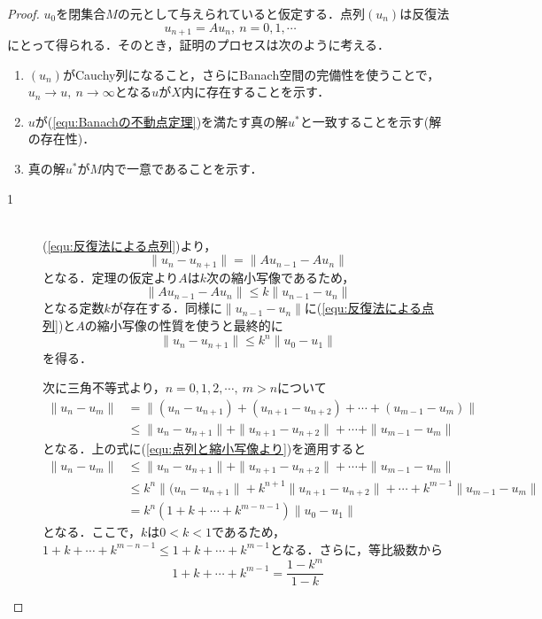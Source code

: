 \documentclass[11pt,a4paper,titlepage]{jsreport}
\theoremstyle{definition}
\begin{document}
\begin{proof}
  $u_0$を閉集合$M$の元として与えられていると仮定する．点列$(u_n)$は反復法
  \begin{equation}
    \label{equ:反復法による点列}
    u_{n+1}=Au_n,\ n=0,1,\cdots
  \end{equation}
  にとって得られる．そのとき，証明のプロセスは次のように考える．
  \begin{enumerate}
    \item $(u_n)$がCauchy列になること，さらにBanach空間の完備性を使うことで，$u_n\rightarrow u,\ n\rightarrow \infty$となる$u$が$X$内に存在することを示す．
    \item $u$が(\ref{equ:Banachの不動点定理})を満たす真の解$u^*$と一致することを示す(解の存在性)．
    \item 真の解$u^*$が$M$内で一意であることを示す．
  \end{enumerate}

  \begin{description}
    \item[1]
      \quad\\
      (\ref{equ:反復法による点列})より，
      \begin{equation}
        \|u_n-u_{n+1}\|=\|Au_{n-1}-Au_{n}\|
      \end{equation}
      となる．定理の仮定より$A$は$k$次の縮小写像であるため，
      \begin{equation}
        \|Au_{n-1}-Au_{n}\|\leq k\|u_{n-1}-u_{n}\|
      \end{equation}
      となる定数$k$が存在する．同様に$\|u_{n-1}-u_{n}\|$に(\ref{equ:反復法による点列})と$A$の縮小写像の性質を使うと最終的に
      \begin{equation}
        \label{equ:点列と縮小写像より}
        \|u_{n}-u_{n+1}\|\leq k^n\|u_{0}-u_{1}\|
      \end{equation}
      を得る．

      次に三角不等式より，$n=0,1,2,\cdots,\ m>n$について
      \begin{align}
        \|u_{n}-u_{m}\| & = \|(u_{n}-u_{n+1})+(u_{n+1}-u_{n+2})+\cdots+(u_{m-1}-u_{m})\|      \\
                        & \leq \|u_{n}-u_{n+1}\|+\|u_{n+1}-u_{n+2}\|+\cdots+\|u_{m-1}-u_{m}\|
      \end{align}
      となる．上の式に(\ref{equ:点列と縮小写像より})を適用すると
      \begin{align}
        \|u_{n}-u_{m}\| & \leq \|u_{n}-u_{n+1}\|+\|u_{n+1}-u_{n+2}\|+\cdots+\|u_{m-1}-u_{m}\| \label{equ:-1}    \\
                        & \leq k^n\|(u_{n}-u_{n+1}\|+k^{n+1}\|u_{n+1}-u_{n+2}\|+\cdots+k^{m-1}\|u_{m-1}-u_{m}\| \\
                        & = k^n(1+k+\cdots+k^{m-n-1})\|u_0-u_1\|
      \end{align}
      となる．ここで，$k$は$0<k<1$であるため，$1+k+\cdots+k^{m-n-1}\leq 1+k+\cdots+k^{m-1}$となる．さらに，等比級数から
      \begin{equation}
        1+k+\cdots+k^{m-1} = \frac{1-k^m}{1-k}
      \end{equation}


\end{description}
\end{proof}
\end{document}
